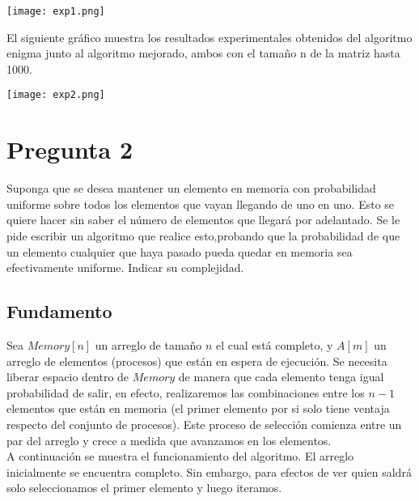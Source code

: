 \documentclass[11pt]{article}
\begin{document}
\begin{center}\texttt{[image: exp1.png]}\end{center}
El siguiente gráfico muestra los resultados experimentales obtenidos del algoritmo enigma junto al algoritmo mejorado, ambos con el tamaño n de la matriz hasta 1000. 
\begin{center}\texttt{[image: exp2.png]}\end{center}


\section{Pregunta 2}
Suponga que se desea mantener un elemento en memoria con probabilidad uniforme sobre todos los elementos que vayan llegando de uno en uno. Esto se quiere hacer sin saber el número de elementos que llegará por adelantado. Se le pide escribir un algoritmo que realice esto,probando que la probabilidad de que un elemento cualquier que haya pasado pueda quedar en memoria sea efectivamente uniforme. Indicar su complejidad.\\
\subsection{Fundamento}
Sea $Memory[n]$ un arreglo de tamaño $n$ el cual está completo, y $A[m]$ un arreglo de elementos (procesos) que están en espera de ejecución. Se necesita liberar espacio dentro de $Memory$ de manera que cada elemento tenga igual probabilidad de salir, en efecto, realizaremos las combinaciones entre los $n-1$ elementos que están en memoria (el primer elemento por si solo tiene ventaja respecto del conjunto de procesos). Este proceso de selección comienza entre un par del arreglo y crece a medida que avanzamos en los elementos.\\
A continuación se muestra el funcionamiento del algoritmo. El arreglo inicialmente se encuentra completo. Sin embargo, para efectos de ver quien saldrá solo seleccionamos el primer elemento y luego iteramos.
\end{document}
